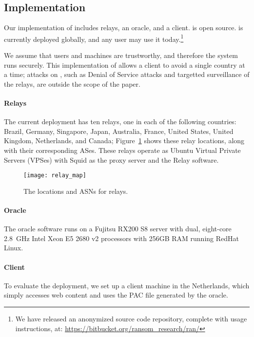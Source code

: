 \subsection{Implementation}

Our implementation of \system{} includes relays, an oracle, and 
a client. \system{} is open source.  \system{} is currently deployed globally, and
any user may use it today.\footnote{We have released an anonymized source code repository,
complete with usage instructions, at: \url{https://bitbucket.org/ransom_research/ran/}}

We assume that users and machines are trustworthy, and therefore the system runs 
securely.  This implementation of \system{} allows a client to avoid a single country 
at a time; attacks on \system{}, such as Denial of Service attacks and targetted 
surveillance of the relays, are outside the scope of the paper.

\paragraph{Relays}  The current deployment has ten relays, one in each
of the following
countries: Brazil,  Germany, Singapore, Japan, Australia, France, United
States, United Kingdom, Netherlands, and Canada; Figure~\ref{fig:relay_locations}
shows these relay locations, along with their corresponding ASes. These relays operate
as Ubuntu Virtual Private Servers (VPSes) with Squid as the proxy
server and the \system{} Relay software.

\begin{figure}[t!]
\centering
\texttt{[image: relay\_map]}
\caption{The locations and ASNs for \system{} relays.}
\label{fig:relay_locations}
\end{figure}

\paragraph{Oracle}  The oracle software runs on a Fujitsu RX200 S8 server with dual, 
eight-core 2.8~GHz Intel Xeon E5 2680 v2 processors with 256GB RAM running 
RedHat Linux. 

\paragraph{Client} To evaluate the \system{} deployment, we set up a client 
machine in the Netherlands, which simply accesses web content and uses the PAC 
file generated by the oracle. 
